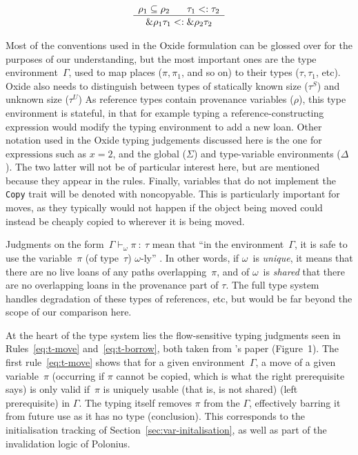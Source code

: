 \documentclass[11pt,a4paper,twoside,openany]{report}
\newcommand{\InRust}[1]{\texttt{#1}}
\newcommand{\expression}[1]{\boxed{#1}}
\newcommand{\ntyperule}[2]{\begin{array}{c}#1\\\hline\raisebox{1pt}{\strut}#2\end{array}}
\begin{document}
\begin{equation}\label{eq:s-ref-baby}
  \ntyperule{
    \rho_1 \subseteq \rho_2 \:\:\:\:\:\:\:\:
    \tau_1 <: \tau_2
  }%
  {
    \&\rho_1 \tau_1 <: \&\rho_2 \tau_2
  }
\end{equation}


Most of the conventions used in the Oxide formulation can be glossed over for
the purposes of our understanding, but the most important ones are the type
environment~$\Gamma$, used to map places ($\pi, \pi_1$, and so on) to their
types ($\tau, \tau_1$, etc). Oxide also needs to distinguish between types of
statically known size ($\tau^S$) and unknown size ($\tau^U$) As reference types
contain provenance variables ($\rho$), this type environment is stateful, in
that for example typing a reference-constructing expression would modify the
typing environment to add a new loan. Other notation used in the Oxide typing
judgements discussed here is the one for $\expression{\text{expressions}}$ such
as $\expression{x = 2}$, and the global ($\Sigma$) and type-variable
environments ($\Delta$). The two latter will not be of particular interest here,
but are mentioned because they appear in the rules. Finally, variables that do
not implement the \InRust{Copy} trait will be denoted with $\text{noncopyable}$.
This is particularly important for moves, as they typically would not happen if
the object being moved could instead be cheaply copied to wherever it is being moved.


Judgments on the form~$\Gamma \vdash_{\omega} \pi \: : \: \tau$ mean that ``in
the environment~$\Gamma$, it is safe to use the variable~$\pi$ (of type~$\tau$)
$\omega$-ly'' \cite{weiss_oxide:_2019}. In other words, if $\omega$~is
\emph{unique}, it means that there are no live loans of any paths
overlapping~$\pi$, and of $\omega$~is \emph{shared} that there are no
overlapping loans in the provenance part of $\tau$. The full type system handles
degradation of these types of references, etc, but would be far beyond the scope
of our comparison here.

At the heart of the type system lies the flow-sensitive typing judgments seen in
Rules~\ref{eq:t-move} and~\ref{eq:t-borrow}, both taken from
\citeauthor*{weiss_oxide:_2019}'s paper (Figure~1). The first
rule~\eqref{eq:t-move} shows that for a given environment~$\Gamma$, a move of a
given variable~$\pi$ (occurring if $\pi$ cannot be copied, which is what the
right prerequisite says) is only valid if~$\pi$ is uniquely usable (that is, is
not shared) (left prerequisite) in $\Gamma$. The typing itself removes $\pi$
from the $\Gamma$, effectively barring it from future use as it has no type
(conclusion). This corresponds to the initialisation tracking of
Section~\ref{sec:var-initalisation}, as well as part of the invalidation logic
of Polonius.
\end{document}
